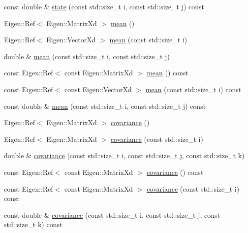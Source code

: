 \begin{DoxyCompactItemize}
const double \& \mbox{\hyperlink{classbfl_1_1ParticleSet_ac3545004318c37e1ec73abb42bc72c71}{state}} (const std\+::size\+\_\+t i, const std\+::size\+\_\+t j) const
\item 
Eigen\+::\+Ref$<$ Eigen\+::\+Matrix\+Xd $>$ \mbox{\hyperlink{classbfl_1_1GaussianMixture_af4fd865a97ac27c72510cfbf9429bd97}{mean}} ()
\item 
Eigen\+::\+Ref$<$ Eigen\+::\+Vector\+Xd $>$ \mbox{\hyperlink{classbfl_1_1GaussianMixture_ad57440f7d524e5129afe70fc36f4fe99}{mean}} (const std\+::size\+\_\+t i)
\item 
double \& \mbox{\hyperlink{classbfl_1_1GaussianMixture_a21013d54d99ca5bfd1ec566a0815821e}{mean}} (const std\+::size\+\_\+t i, const std\+::size\+\_\+t j)
\item 
const Eigen\+::\+Ref$<$ const Eigen\+::\+Matrix\+Xd $>$ \mbox{\hyperlink{classbfl_1_1GaussianMixture_ad420f06f7680003453f64fd18bbb67da}{mean}} () const
\item 
const Eigen\+::\+Ref$<$ const Eigen\+::\+Vector\+Xd $>$ \mbox{\hyperlink{classbfl_1_1GaussianMixture_ad0dab37b16097d498dedaf23d0af3c18}{mean}} (const std\+::size\+\_\+t i) const
\item 
const double \& \mbox{\hyperlink{classbfl_1_1GaussianMixture_ac3baa237bc22f156f57d4c02deb4f518}{mean}} (const std\+::size\+\_\+t i, const std\+::size\+\_\+t j) const
\item 
Eigen\+::\+Ref$<$ Eigen\+::\+Matrix\+Xd $>$ \mbox{\hyperlink{classbfl_1_1GaussianMixture_a65a60ef46d16ac33196a09963bbccdee}{covariance}} ()
\item 
Eigen\+::\+Ref$<$ Eigen\+::\+Matrix\+Xd $>$ \mbox{\hyperlink{classbfl_1_1GaussianMixture_a80a6fa7d9edfc95103236378b4da3f7f}{covariance}} (const std\+::size\+\_\+t i)
\item 
double \& \mbox{\hyperlink{classbfl_1_1GaussianMixture_ad2c74407e682e3b4322df2d0e1cef28e}{covariance}} (const std\+::size\+\_\+t i, const std\+::size\+\_\+t j, const std\+::size\+\_\+t k)
\item 
const Eigen\+::\+Ref$<$ const Eigen\+::\+Matrix\+Xd $>$ \mbox{\hyperlink{classbfl_1_1GaussianMixture_a172c11264e6ff449a44ec21701eadc4d}{covariance}} () const
\item 
const Eigen\+::\+Ref$<$ const Eigen\+::\+Matrix\+Xd $>$ \mbox{\hyperlink{classbfl_1_1GaussianMixture_a3cff0f507ed950fe6a5e0aba1bf8467a}{covariance}} (const std\+::size\+\_\+t i) const
\item 
const double \& \mbox{\hyperlink{classbfl_1_1GaussianMixture_a4ca0b098be0fc923f454e73e9dccf78f}{covariance}} (const std\+::size\+\_\+t i, const std\+::size\+\_\+t j, const std\+::size\+\_\+t k) const

\end{DoxyCompactItemize}
